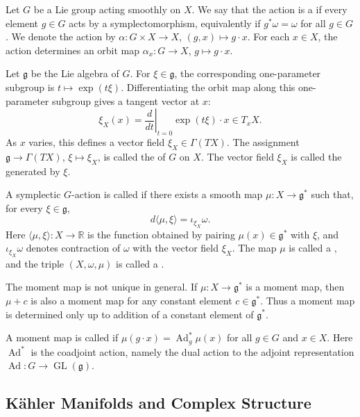 {Let \(G\) be a Lie group acting smoothly on \(X\).  We say that the
action is a  if every element \(g\in G\) acts
by a symplectomorphism, equivalently if \(g^*\omega=\omega\) for all
\(g\in G\).  We denote the action by
\(\alpha:G\times X\to X\), \((g,x)\mapsto g\cdot x\).  For each
\(x\in X\), the action determines an orbit map
\(\alpha_x:G\to X\), \(g\mapsto g\cdot x\).

Let \(\mathfrak g\) be the Lie algebra of \(G\).  For
\(\xi\in\mathfrak g\), the corresponding one-parameter subgroup is
\(t\mapsto \exp(t\xi)\).  Differentiating the orbit map along this
one-parameter subgroup gives a tangent vector at \(x\):
\[
\xi_X(x)
=
\left.\frac{d}{dt}\right|_{t=0}
\exp(t\xi)\cdot x
\in T_xX.
\]
As \(x\) varies, this defines a vector field \(\xi_X\in\Gamma(TX)\).
The assignment \(\mathfrak g\to\Gamma(TX)\), \(\xi\mapsto\xi_X\), is
called the  of \(G\) on \(X\).  The vector
field \(\xi_X\) is called the  generated
by \(\xi\).

A symplectic \(G\)-action is called  if there exists
a smooth map \(\mu:X\to\mathfrak g^*\) such that, for every
\(\xi\in\mathfrak g\),
\[
d\langle \mu,\xi\rangle
=
\iota_{\xi_X}\omega .
\]
Here \(\langle\mu,\xi\rangle:X\to\mathbb R\) is the function obtained by
pairing \(\mu(x)\in\mathfrak g^*\) with \(\xi\), and
\(\iota_{\xi_X}\omega\) denotes contraction of \(\omega\) with the vector
field \(\xi_X\).  The map \(\mu\) is called a , and
the triple \((X,\omega,\mu)\) is called a .

The moment map is not unique in general.  If \(\mu:X\to\mathfrak g^*\)
is a moment map, then \(\mu+c\) is also a moment map for any constant
element \(c\in\mathfrak g^*\).  Thus a moment map is determined only up
to addition of a constant element of \(\mathfrak g^*\).

A moment map is called  if
\(\mu(g\cdot x)=\operatorname{Ad}^*_g\mu(x)\) for all \(g\in G\) and
\(x\in X\).  Here \(\operatorname{Ad}^*\) is the coadjoint action, namely
the dual action to the adjoint representation
\(\operatorname{Ad}:G\to\operatorname{GL}(\mathfrak g)\).


\subsection{Kähler Manifolds and Complex Structure}

}
